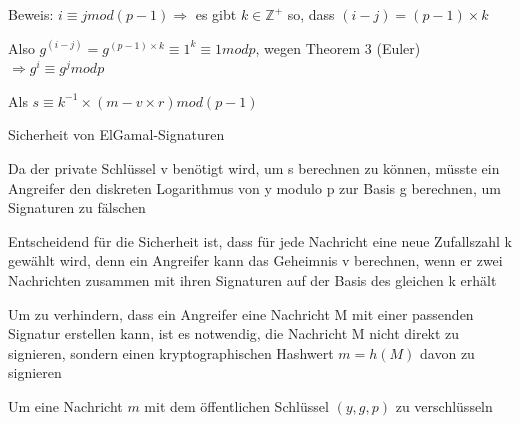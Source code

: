 \documentclass[a4paper]{article}
\begin{document}
\begin{multicols}{3}
\begin{itemize*}
\begin{itemize*}
\begin{itemize*}
                        \item Beweis: $i \equiv j mod (p-1) \Rightarrow$ es gibt $k\in \mathbb{Z}^+$ so, dass $(i-j)=(p-1)\times k$
                        \item Also $g^{(i-j)}=g^{(p-1)\times k} \equiv 1^k\equiv 1 mod p$, wegen Theorem 3 (Euler) $\Rightarrow g^i \equiv g^j mod p$
                  \end{itemize*}
                  \item Als $s\equiv k^{-1}\times(m-v\times r) mod (p-1)$
            \end{itemize*}
            \item Sicherheit von ElGamal-Signaturen
            \begin{itemize*}
                  \item Da der private Schlüssel v benötigt wird, um s berechnen zu können, müsste ein Angreifer den diskreten Logarithmus von y modulo p zur Basis g berechnen, um Signaturen zu fälschen
                  \item Entscheidend für die Sicherheit ist, dass für jede Nachricht eine neue Zufallszahl k gewählt wird, denn ein Angreifer kann das Geheimnis v berechnen, wenn er zwei Nachrichten zusammen mit ihren Signaturen auf der Basis des gleichen k erhält
                  \item Um zu verhindern, dass ein Angreifer eine Nachricht M mit einer passenden Signatur erstellen kann, ist es notwendig, die Nachricht M nicht direkt zu signieren, sondern einen kryptographischen Hashwert $m=h(M)$ davon zu signieren
            \end{itemize*}
            \item Um eine Nachricht $m$ mit dem öffentlichen Schlüssel $(y,g,p)$ zu verschlüsseln

\end{itemize*}
\end{multicols}
\end{document}
